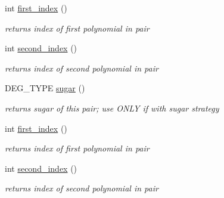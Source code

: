 \begin{Indent}
\begin{DoxyCompactItemize}
\mbox{\label{class_critical___pair___x_plor_ac163e7707177e0c8566903ffdedea821}} 
int \hyperlink{class_critical___pair___x_plor_ac163e7707177e0c8566903ffdedea821}{first\+\_\+index} ()
\begin{DoxyCompactList}\small\item\em returns index of first polynomial in pair \end{DoxyCompactList}\item 
\mbox{\label{class_critical___pair___x_plor_a201f10149987060902a3999e4db201b9}} 
int \hyperlink{class_critical___pair___x_plor_a201f10149987060902a3999e4db201b9}{second\+\_\+index} ()
\begin{DoxyCompactList}\small\item\em returns index of second polynomial in pair \end{DoxyCompactList}\item 
\mbox{\label{class_critical___pair___x_plor_a85d34fcde810b942744433d1311ac331}} 
D\+E\+G\+\_\+\+T\+Y\+PE \hyperlink{class_critical___pair___x_plor_a85d34fcde810b942744433d1311ac331}{sugar} ()
\begin{DoxyCompactList}\small\item\em returns sugar of this pair; use O\+N\+LY if with sugar strategy \end{DoxyCompactList}\item 
\mbox{\label{class_critical___pair___x_plor_ac163e7707177e0c8566903ffdedea821}} 
int \hyperlink{class_critical___pair___x_plor_ac163e7707177e0c8566903ffdedea821}{first\+\_\+index} ()
\begin{DoxyCompactList}\small\item\em returns index of first polynomial in pair \end{DoxyCompactList}\item 
\mbox{\label{class_critical___pair___x_plor_a201f10149987060902a3999e4db201b9}} 
int \hyperlink{class_critical___pair___x_plor_a201f10149987060902a3999e4db201b9}{second\+\_\+index} ()
\begin{DoxyCompactList}\small\item\em returns index of second polynomial in pair \end{DoxyCompactList}\item 

\end{DoxyCompactItemize}
\end{Indent}

